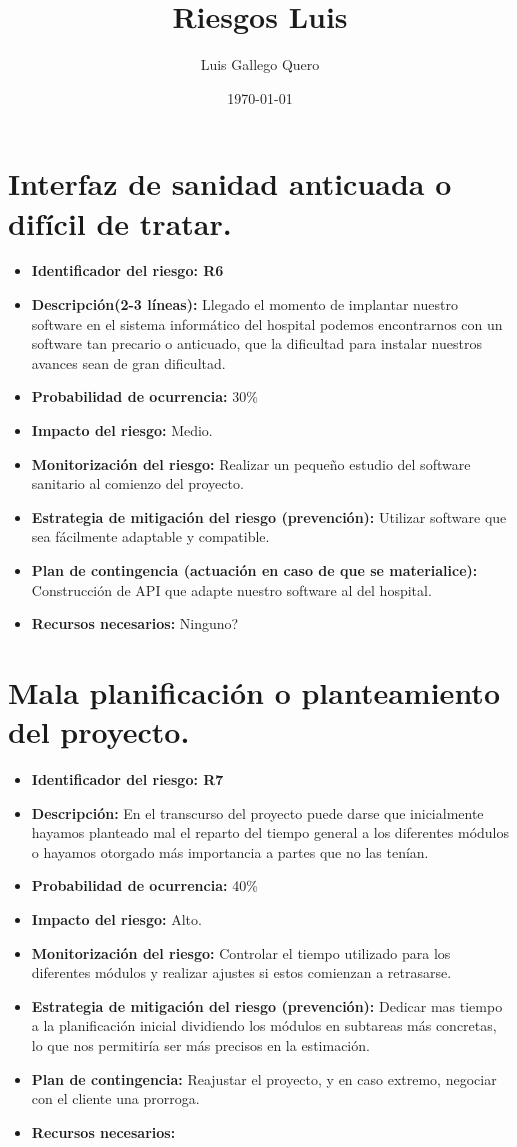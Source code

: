 \documentclass[a4paper,12pt,oneside]{article}
\title{Riesgos Luis}
\author{Luis Gallego Quero}
\date{\today}
\begin{document}
\maketitle			
 
\section*{Interfaz de sanidad anticuada o difícil de tratar.}

\begin{itemize}
	\item \textbf{Identificador del riesgo: R6}
	\item \textbf{Descripción(2-3 líneas): } Llegado el momento de implantar nuestro software en el sistema informático del hospital podemos encontrarnos con un software tan precario o anticuado, que la dificultad para instalar nuestros avances sean de gran dificultad.
	\item \textbf{Probabilidad de ocurrencia: } 30\%
	\item \textbf{Impacto del riesgo: } Medio.
	\item \textbf{Monitorización del riesgo: } Realizar un pequeño estudio del software sanitario al comienzo del proyecto. 
	\item \textbf{Estrategia de mitigación del riesgo (prevención): } Utilizar software que sea fácilmente adaptable y compatible. 
	\item \textbf{Plan de contingencia (actuación en caso de que se materialice): } Construcción de API que adapte nuestro software al del hospital.
	\item \textbf{Recursos necesarios: } Ninguno?
\end{itemize}

\section*{Mala planificación o planteamiento del proyecto.}
\begin{itemize}
	\item \textbf{Identificador del riesgo: R7}
	\item \textbf{Descripción: } En el transcurso del proyecto puede darse que inicialmente hayamos planteado mal el reparto del tiempo general a los diferentes módulos o hayamos otorgado más importancia a partes que no las tenían.
	\item \textbf{Probabilidad de ocurrencia: } 40\%
	\item \textbf{Impacto del riesgo: } Alto.
	\item \textbf{Monitorización del riesgo: } Controlar el tiempo utilizado para los diferentes módulos y realizar ajustes si estos comienzan a retrasarse.
	\item \textbf{Estrategia de mitigación del riesgo (prevención): } Dedicar mas tiempo a la planificación inicial dividiendo los módulos en subtareas más concretas, lo que nos permitiría ser más precisos en la estimación.
	\item \textbf{Plan de contingencia: } Reajustar el proyecto, y en caso extremo, negociar con el cliente una prorroga.
	\item \textbf{Recursos necesarios: }
\end{itemize}
\end{document}
